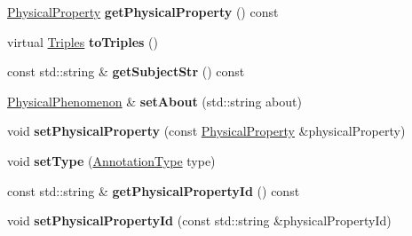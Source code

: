 \begin{DoxyCompactItemize}
\item 
\mbox{\label{classomexmeta_1_1PhysicalPhenomenon_ac741cab1f6df58b0de484fc1771ef839}} 
\hyperlink{classomexmeta_1_1PhysicalProperty}{Physical\+Property} {\bfseries get\+Physical\+Property} () const
\item 
\mbox{\label{classomexmeta_1_1PhysicalPhenomenon_a30617e685bd8b155a76d38ab5a9db273}} 
virtual \hyperlink{classomexmeta_1_1Triples}{Triples} {\bfseries to\+Triples} ()
\item 
\mbox{\label{classomexmeta_1_1PhysicalPhenomenon_ae99e667cbceff2da0c4c0f5c64a8ba8f}} 
const std\+::string \& {\bfseries get\+Subject\+Str} () const
\item 
\mbox{\label{classomexmeta_1_1PhysicalPhenomenon_a0a9c54b0c4bfad62b618766474dc70f8}} 
\hyperlink{classomexmeta_1_1PhysicalPhenomenon}{Physical\+Phenomenon} \& {\bfseries set\+About} (std\+::string about)
\item 
\mbox{\label{classomexmeta_1_1PhysicalPhenomenon_afad41dbf096b22ab9b64441cb25e9db9}} 
void {\bfseries set\+Physical\+Property} (const \hyperlink{classomexmeta_1_1PhysicalProperty}{Physical\+Property} \&physical\+Property)
\item 
\mbox{\label{classomexmeta_1_1PhysicalPhenomenon_a4c27a0b0e430df95b3cffaf268973eec}} 
void {\bfseries set\+Type} (\hyperlink{namespaceomexmeta_a1129ebb8a92218ebb27b9c76ac8462f7}{Annotation\+Type} type)
\item 
\mbox{\label{classomexmeta_1_1PhysicalPhenomenon_aca53e0f8ce8139a919f48372b254a5d0}} 
const std\+::string \& {\bfseries get\+Physical\+Property\+Id} () const
\item 
\mbox{\label{classomexmeta_1_1PhysicalPhenomenon_a715b76003eba8e5808fe44a768199fab}} 
void {\bfseries set\+Physical\+Property\+Id} (const std\+::string \&physical\+Property\+Id)
\end{DoxyCompactItemize}

